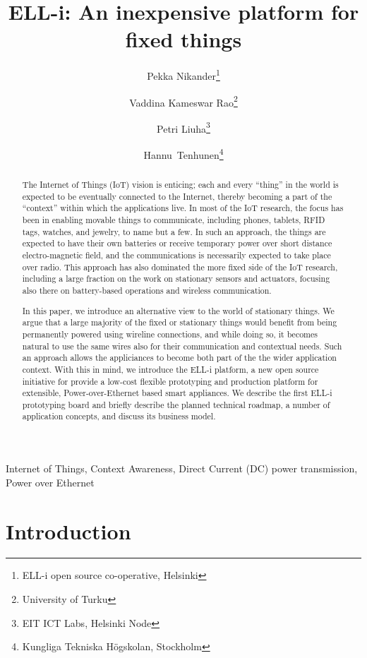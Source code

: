 \documentclass[draft,a4paper]{siamltex}
\title{{ELL-i}: An inexpensive platform for fixed things}
\author{Pekka Nikander\thanks{{ELL-i} open source co-operative, Helsinki}
  \and Vaddina Kameswar Rao\thanks{University of Turku}
  \and Petri Liuha\thanks{EIT ICT Labs, Helsinki Node}
  \and \hbox{Hannu Tenhunen}\thanks{Kungliga Tekniska H\"{o}gskolan, Stockholm}}
\begin{document}
\maketitle

\begin{abstract}
The Internet of Things (IoT) vision is enticing; each and every
``thing'' in the world is expected to be eventually connected to the
Internet, thereby becoming a part of the ``context'' within which the
applications live.  
In most of the IoT research, the focus has been in enabling
movable things to communicate, including phones, tablets, RFID tags,
watches, and jewelry, to name but a few.  In such an approach, the
things are expected to have their own batteries or receive temporary
power over short distance electro-magnetic field, and the
communications is necessarily expected to take place over radio.
This approach has also dominated the more fixed side of the
IoT research, including a large fraction on the work on stationary
sensors and actuators, focusing also there on battery-based operations
and wireless communication. 

In this paper, we introduce an alternative view to the world
of stationary things.  We argue that a large majority of the fixed or
stationary things would benefit from being permanently powered using
wireline connections, and while doing so, it becomes natural to use
the same wires also for their communication and contextual needs.
Such an approach allows the appliciances to become both part of the
the wider application context.  With this in mind,
we introduce the
ELL-i platform, a new open source initiative for provide a low-cost
flexible prototyping and production platform for extensible,
Power-over-Ethernet based smart appliances.  We describe the first
ELL-i prototyping board and briefly describe the planned technical
roadmap, a number of application concepts, and discuss its
business model. 
\end{abstract}

\begin{keywords} 
Internet of Things, Context Awareness, Direct Current (DC) power
transmission, Power over Ethernet
\end{keywords}

\pagestyle{myheadings}
\thispagestyle{plain}


\section{Introduction}
\end{document}
